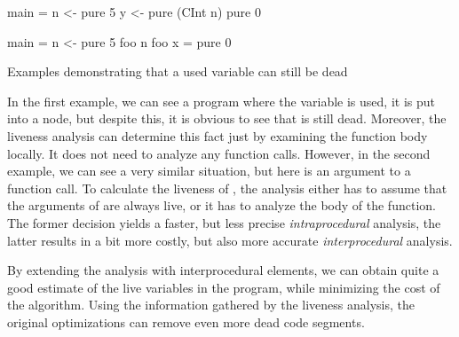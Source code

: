 \documentclass[main.tex]{subfiles}
\begin{document}
	\begin{codeFloat}[h]
		\begin{center}
			\begin{minipage}{0.375\textwidth}
				\begin{haskell}
					main = 
					  n <- pure 5
					  y <- pure (CInt n)
					  pure 0
				\end{haskell}
			\end{minipage}
			\hspace{1cm}
			\begin{minipage}{0.375\textwidth}
				\begin{haskell}
					main = 
					  n <- pure 5
					  foo n
					foo x = pure 0
				\end{haskell}
			\end{minipage}
		\end{center}
		\caption{Examples demonstrating that a used variable can still be dead}
		\label{code:lva-example}
	\end{codeFloat}

	In the first example, we can see a program where the variable  is used, it is put into a  node, but despite this, it is obvious to see that  is still dead. Moreover, the liveness analysis can determine this fact just by examining the function body locally. It does not need to analyze any function calls. However, in the second example, we can see a very similar situation, but here  is an argument to a function call. To calculate the liveness of , the analysis either has to assume that the arguments of  are always live, or it has to analyze the body of the function. The former decision yields a faster, but less precise \emph{intraprocedural} analysis, the latter results in a bit more costly, but also more accurate \emph{interprocedural} analysis.
	
	By extending the analysis with interprocedural elements, we can obtain quite a good estimate of the live variables in the program, while minimizing the cost of the algorithm. Using the information gathered by the liveness analysis, the original optimizations can remove even more dead code segments.
	
	

	
\end{document}
